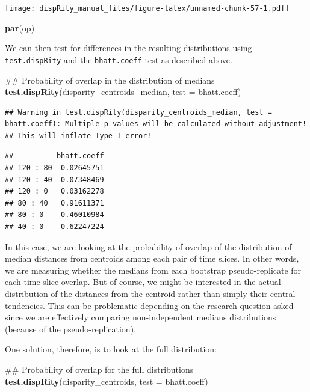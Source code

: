 \documentclass[]{book}
\newenvironment{Shaded}{\begin{snugshade}}{\end{snugshade}}
\newcommand{\KeywordTok}[1]{\textcolor[rgb]{0.13,0.29,0.53}{\textbf{#1}}}
\newcommand{\DataTypeTok}[1]{\textcolor[rgb]{0.13,0.29,0.53}{#1}}
\newcommand{\NormalTok}[1]{#1}
\theoremstyle{definition}
\theoremstyle{definition}
\theoremstyle{remark}
\begin{document}
\texttt{[image: dispRity\_manual\_files/figure-latex/unnamed-chunk-57-1.pdf]}

\begin{Shaded}
\begin{Highlighting}[]
\KeywordTok{par}\NormalTok{(op)}
\end{Highlighting}
\end{Shaded}

We can then test for differences in the resulting distributions using
\texttt{test.dispRity} and the \texttt{bhatt.coeff} test as described
above.

\begin{Shaded}
\begin{Highlighting}[]
\NormalTok{## Probability of overlap in the distribution of medians}
\KeywordTok{test.dispRity}\NormalTok{(disparity_centroids_median, }\DataTypeTok{test =}\NormalTok{ bhatt.coeff)}
\end{Highlighting}
\end{Shaded}

\begin{verbatim}
## Warning in test.dispRity(disparity_centroids_median, test = bhatt.coeff): Multiple p-values will be calculated without adjustment!
## This will inflate Type I error!
\end{verbatim}

\begin{verbatim}
##          bhatt.coeff
## 120 : 80  0.02645751
## 120 : 40  0.07348469
## 120 : 0   0.03162278
## 80 : 40   0.91611371
## 80 : 0    0.46010984
## 40 : 0    0.62247224
\end{verbatim}

In this case, we are looking at the probability of overlap of the
distribution of median distances from centroids among each pair of time
slices. In other words, we are measuring whether the medians from each
bootstrap pseudo-replicate for each time slice overlap. But of course,
we might be interested in the actual distribution of the distances from
the centroid rather than simply their central tendencies. This can be
problematic depending on the research question asked since we are
effectively comparing non-independent medians distributions (because of
the pseudo-replication).

One solution, therefore, is to look at the full distribution:

\begin{Shaded}
\begin{Highlighting}[]
\NormalTok{## Probability of overlap for the full distributions}
\KeywordTok{test.dispRity}\NormalTok{(disparity_centroids, }\DataTypeTok{test =}\NormalTok{ bhatt.coeff)}
\end{Highlighting}
\end{Shaded}
\end{document}
